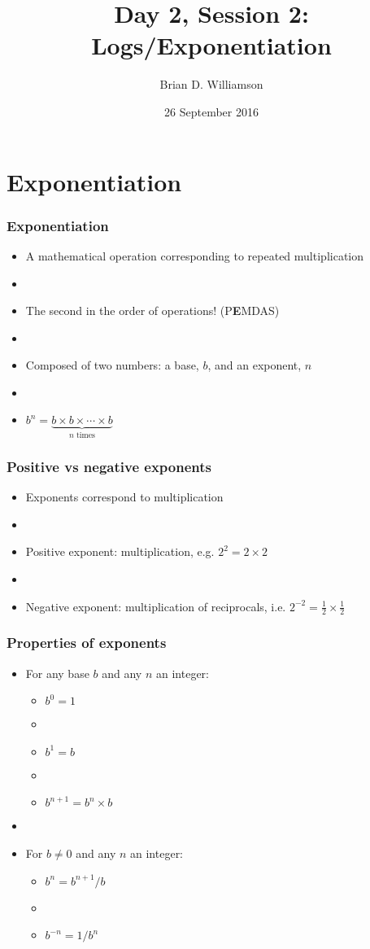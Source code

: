 \documentclass[12pt]{beamer}
\title{Day 2, Session 2: Logs/Exponentiation}
\author{Brian D. Williamson}
\institute{EPI/BIOST Bootcamp 2016}
\date{26 September 2016}
\newcommand{\myframe}[1]{\begin{frame} \frametitle{#1}}
\begin{document}
\begin{frame}
\titlepage
\end{frame}

\section{Exponentiation}
\myframe{Exponentiation}
\begin{itemize}
\item A mathematical operation corresponding to repeated multiplication
\item[]
\item The second in the order of operations! (P{\textbf E}MDAS)
\item[]
\item Composed of two numbers: a base, $b$, and an exponent, $n$
\item[]
\item $b^n = \underbrace{b\times b \times \cdots \times b}_\text{$n$ times}$
\end{itemize}
\end{frame}

\myframe{Positive vs negative exponents}
\begin{itemize}
\item Exponents correspond to multiplication
\item[]
\item Positive exponent: multiplication, e.g. $2^2 = 2\times 2$
\item[]
\item Negative exponent: multiplication of reciprocals, i.e. $2^{-2} = \frac{1}{2}\times \frac{1}{2}$
\end{itemize}
\end{frame}

\myframe{Properties of exponents}
\begin{itemize}
\item For any base $b$ and any $n$ an integer:
\begin{itemize}
\item $b^0 = 1$
\item[]
\item $b^1 = b$
\item[]
\item $b^{n+1} = b^n \times b$
\end{itemize}
\item[]
\item For $b \neq 0$ and any $n$ an integer:
\begin{itemize}
\item $b^n = b^{n+1}/b$
\item[]
\item $b^{-n} = 1/b^n$
\end{itemize}
\end{itemize}
\end{frame}
\end{document}
